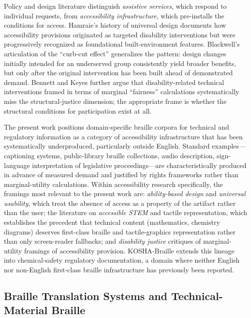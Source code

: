 \documentclass[smallextended]{svjour3}
\begin{document}
Policy and design literature distinguish \emph{assistive services}, which respond to individual requests, from \emph{accessibility infrastructure}, which pre-installs the conditions for access. Hamraie's history of universal design \cite{hamraie} documents how accessibility provisions originated as targeted disability interventions but were progressively recognized as foundational built-environment features. Blackwell's articulation of the ``curb-cut effect'' \cite{curb_cut} generalizes the pattern: design changes initially intended for an underserved group consistently yield broader benefits, but only after the original intervention has been built ahead of demonstrated demand. Bennett and Keyes \cite{bennett_keyes} further argue that disability-related technical interventions framed in terms of marginal ``fairness'' calculations systematically miss the structural-justice dimension; the appropriate frame is whether the structural conditions for participation exist at all.

The present work positions domain-specific braille corpora for technical and regulatory information as a category of accessibility infrastructure that has been systematically underproduced, particularly outside English. Standard examples---captioning systems, public-library braille collections, audio description, sign-language interpretation of legislative proceedings---are characteristically produced in advance of measured demand and justified by rights frameworks rather than marginal-utility calculations. Within accessibility research specifically, the framings most relevant to the present work are: \emph{ability-based design} and \emph{universal usability}, which treat the absence of access as a property of the artifact rather than the user; the literature on \emph{accessible STEM} and tactile representation, which establishes the precedent that technical content (mathematics, chemistry diagrams) deserves first-class braille and tactile-graphics representation rather than only screen-reader fallbacks; and \emph{disability justice} critiques of marginal-utility framings of accessibility provision. KOSHA-Braille extends this lineage into chemical-safety regulatory documentation, a domain where neither English nor non-English first-class braille infrastructure has previously been reported.

\subsection{Braille Translation Systems and Technical-Material Braille}
\end{document}
